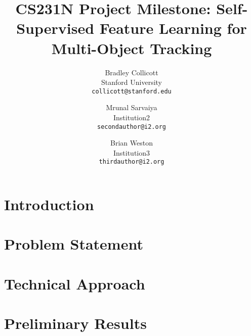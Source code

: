 \documentclass[10pt,twocolumn,letterpaper]{article}
\begin{document}
\title{CS231N Project Milestone: Self-Supervised Feature Learning for Multi-Object Tracking}

\author{Bradley Collicott\\
Stanford University\\
{\tt\small collicott@stanford.edu}
\and
Mrunal Sarvaiya\\
Institution2\\
{\tt\small secondauthor@i2.org}
\and
Brian Weston\\
Institution3\\
{\tt\small thirdauthor@i2.org}
}

\maketitle

\begin{abstract}

\end{abstract}

\section{Introduction}

\section{Problem Statement}

\section{Technical Approach}

\section{Preliminary Results}

{\small


}
\end{document}
